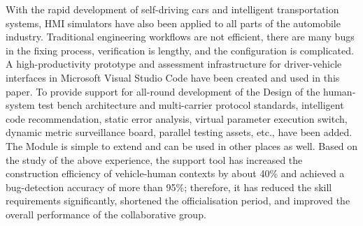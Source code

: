 \begin{abstracten}

With the rapid development of self-driving cars and intelligent transportation systems, HMI simulators have also been applied to all parts of the automobile industry. Traditional engineering workflows are not efficient, there are many bugs in the fixing process, verification is lengthy, and the configuration is complicated. A high-productivity prototype and assessment infrastructure for driver-vehicle interfaces in Microsoft Visual Studio Code have been created and used in this paper. To provide support for all-round development of the Design of the human-system test bench architecture and multi-carrier protocol standards, intelligent code recommendation, static error analysis, virtual parameter execution switch, dynamic metric surveillance board, parallel testing assets, etc., have been added. The Module is simple to extend and can be used in other places as well. Based on the study of the above experience, the support tool has increased the construction efficiency of vehicle-human contexts by about 40\% and achieved a bug-detection accuracy of more than 95\%; therefore, it has reduced the skill requirements significantly, shortened the officialisation period, and improved the overall performance of the collaborative group.

\end{abstracten}

